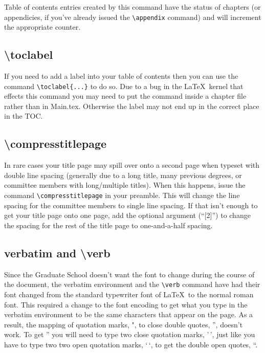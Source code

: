 Table of contents entries created by this command have the status of chapters (or appendicies, if you've already issued the \verb=\appendix= command) and will increment the appropriate counter.

\subsection{\textbackslash toclabel}
If you need to add a label into your table of contents then you can use the command \verb=\toclabel{...}= to do so.  Due to a bug in the \LaTeX\ kernel that effects this command you may need to put the command inside a chapter file rather than in Main.tex. Otherwise the label may not end up in the correct place in the TOC.

\subsection{\textbackslash compresstitlepage}
In rare cases your title page may spill over onto a second page when typeset with double line spacing (generally due to a long title, many previous degrees, or committee members with long/multiple titles).  When this happens, issue the command \verb=\compresstitlepage= in your preamble.  This will change the line spacing for the committee members to single line spacing.  If that isn't enough to get your title page onto one page, add the optional argument (``[2]'') to change the spacing for the rest of the title page to one-and-a-half spacing.

\subsection{verbatim and \textbackslash verb}
Since the Graduate School doesn't want the font to change during the course of the document, the verbatim environment and the \verb=\verb= command have had their font changed from the standard typewriter font of \LaTeX\ to the normal roman font.  This required a change to the font encoding to get what you type in the verbatim environment to be the same characters that appear on the page.  As a result, the mapping of quotation marks, ", to close double quotes, '', doesn't work.  To get '' you will need to type two close quotation marks, '\,', just like you have to type two two open quotation marks, `\,`, to get the double open quotes, ``.

